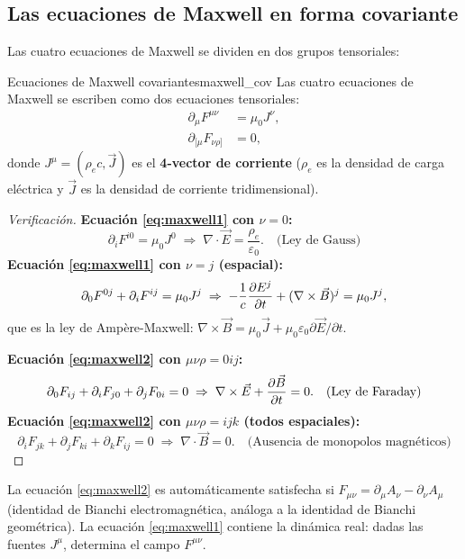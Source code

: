 \subsection{Las ecuaciones de Maxwell en forma covariante}

Las cuatro ecuaciones de Maxwell se dividen en dos grupos tensoriales:

\begin{teorema}{Ecuaciones de Maxwell covariantes}{maxwell_cov}
Las cuatro ecuaciones de Maxwell se escriben como dos ecuaciones tensoriales:
\begin{align}
  \partial_\mu F^{\mu\nu} &= \mu_0 J^\nu, \label{eq:maxwell1}\\[4pt]
  \partial_{[\mu} F_{\nu\rho]} &= 0, \label{eq:maxwell2}
\end{align}
donde $J^\mu = (\rho_e c, \vec{J})$ es el \textbf{4-vector de corriente} ($\rho_e$ es la densidad de carga eléctrica y $\vec{J}$ es la densidad de corriente tridimensional).
\end{teorema}

\begin{proof}[Verificación]
\textbf{Ecuación \eqref{eq:maxwell1} con $\nu = 0$:}
\[
  \partial_i F^{i0} = \mu_0 J^0
  \;\Rightarrow\;
  \nabla\cdot\vec{E} = \frac{\rho_e}{\varepsilon_0}. \quad \text{(Ley de Gauss)}
\]
\textbf{Ecuación \eqref{eq:maxwell1} con $\nu = j$ (espacial):}
\[
  \partial_0 F^{0j} + \partial_i F^{ij} = \mu_0 J^j
  \;\Rightarrow\;
  -\frac{1}{c}\dfrac{\partial E^j}{\partial t} + (\nabla\times\vec{B})^j = \mu_0 J^j,
\]
que es la ley de Ampère-Maxwell: $\nabla\times\vec{B} = \mu_0\vec{J} + \mu_0\varepsilon_0 \partial\vec{E}/\partial t$.

\textbf{Ecuación \eqref{eq:maxwell2} con $\mu\nu\rho = 0ij$:}
\[
  \partial_0 F_{ij} + \partial_i F_{j0} + \partial_j F_{0i} = 0
  \;\Rightarrow\;
  \nabla\times\vec{E} + \dfrac{\partial \vec{B}}{\partial t} = 0. \quad \text{(Ley de Faraday)}
\]
\textbf{Ecuación \eqref{eq:maxwell2} con $\mu\nu\rho = ijk$ (todos espaciales):}
\[
  \partial_i F_{jk} + \partial_j F_{ki} + \partial_k F_{ij} = 0
  \;\Rightarrow\;
  \nabla\cdot\vec{B} = 0. \quad \text{(Ausencia de monopolos magnéticos)}
\]
\end{proof}

\begin{importante}
La ecuación \eqref{eq:maxwell2} es automáticamente satisfecha si $F_{\mu\nu} = \partial_\mu A_\nu - \partial_\nu A_\mu$ (identidad de Bianchi electromagnética, análoga a la identidad de Bianchi geométrica). La ecuación \eqref{eq:maxwell1} contiene la dinámica real: dadas las fuentes $J^\mu$, determina el campo $F^{\mu\nu}$.
\end{importante}

